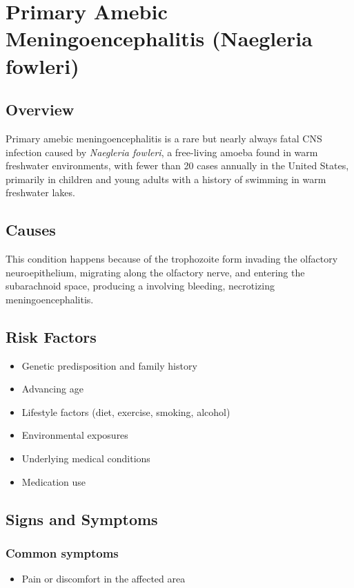 \chapter{Primary Amebic Meningoencephalitis (Naegleria fowleri)}
\label{sec:Naegleria fowleri}

\section{Overview}
Primary amebic meningoencephalitis is a rare but nearly always fatal CNS infection caused by \textit{Naegleria fowleri}, a free-living amoeba found in warm freshwater environments, with fewer than 20 cases annually in the United States, primarily in children and young adults with a history of swimming in warm freshwater lakes.
\section{Causes}
This condition happens because of the trophozoite form invading the olfactory neuroepithelium, migrating along the olfactory nerve, and entering the subarachnoid space, producing a involving bleeding, necrotizing meningoencephalitis.     
\section{Risk Factors}

\begin{itemize}[noitemsep]
  \item Genetic predisposition and family history
  \item Advancing age
  \item Lifestyle factors (diet, exercise, smoking, alcohol)
  \item Environmental exposures
  \item Underlying medical conditions
  \item Medication use
\end{itemize}
\section{Signs and Symptoms}

\subsection{Common symptoms}
\begin{itemize}[noitemsep]
  \item Pain or discomfort in the affected area
  \end{itemize}

